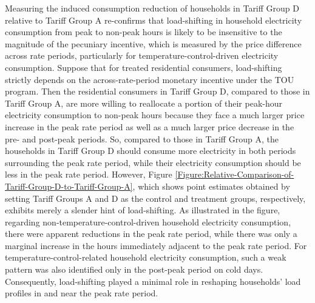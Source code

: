 Measuring the induced consumption reduction of households in Tariff Group D relative to Tariff Group A re-confirms that load-shifting in household electricity consumption from peak to non-peak hours is likely to be insensitive to the magnitude of the pecuniary incentive, which is measured by the price difference across rate periods, particularly for temperature-control-driven electricity consumption. Suppose that for treated residential consumers, load-shifting strictly depends on the across-rate-period monetary incentive under the TOU program. Then the residential consumers in Tariff Group D, compared to those in Tariff Group A, are more willing to reallocate a portion of their peak-hour electricity consumption to non-peak hours because they face a much larger price increase in the peak rate period as well as a much larger price decrease in the pre- and post-peak periods. So, compared to those in Tariff Group A, the households in Tariff Group D should consume more electricity in both periods surrounding the peak rate period, while their electricity consumption should be less in the peak rate period. However, Figure \ref{Figure:Relative-Comparison-of-Tariff-Group-D-to-Tariff-Group-A}, which shows point estimates obtained by setting Tariff Groups A and D as the control and treatment groups, respectively, exhibits merely a slender hint of load-shifting. As illustrated in the figure, regarding non-temperature-control-driven household electricity consumption, there were apparent reductions in the peak rate period, while there was only a marginal increase in the hours immediately adjacent to the peak rate period. For temperature-control-related household electricity consumption, such a weak pattern was also identified only in the post-peak period on cold days. Consequently, load-shifting played a minimal role in reshaping households' load profiles in and near the peak rate period. 
